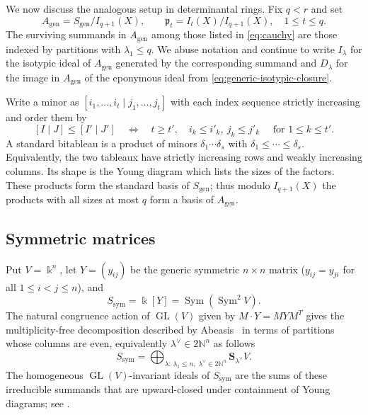 \documentclass[11pt,reqno]{amsart}
\numberwithin{equation}{subsection}
\theoremstyle{definition}
\theoremstyle{remark}
\DeclareMathOperator{\GL}{GL}
\DeclareMathOperator{\Sym}{Sym}
\newcommand{\kfield}{\Bbbk}
\newcommand{\fp}{\mathfrak p}
\newcommand{\Schur}{\mathbf S}
\begin{document}
We now discuss the analogous setup in determinantal rings. Fix $q<r$ and set
\begin{equation}\label{eq:generic-quotient}
 A_{\mathrm{gen}}=S_{\mathrm{gen}}/I_{q+1}(X),
 \qquad
 \fp_t=I_t(X)/I_{q+1}(X),\quad 1\le t\le q.
\end{equation}
The surviving summands in $A_{\mathrm{gen}}$ among those listed in  \eqref{eq:cauchy} are those indexed by
partitions with  $\lambda_1\leq q$.  We abuse notation and continue to write $I_\lambda$ for the isotypic ideal of $A_{\mathrm{gen}}$ generated by the corresponding summand and $D_\lambda$ for the image in $A_{\mathrm{gen}}$ of the eponymous ideal from \eqref{eq:generic-isotypic-closure}. 

Write a minor as $[i_1,\ldots,i_t\mid j_1,\ldots,j_t]$
with each index sequence strictly increasing and order them by
\[
 [I\mid J]\le[I'\mid J']
 \quad\Longleftrightarrow\quad
 t\ge t',\quad i_k\le i'_k,\ j_k\le j'_k\quad \text{ for } 1\le k\le t'.
\]
A standard bitableau is a product of minors $\delta_1\cdots\delta_s$ with
$\delta_1\le\cdots\le\delta_s$.  Equivalently, the two tableaux have strictly increasing rows
and weakly increasing columns.  Its shape is the Young diagram which lists the sizes of the
factors. These products form the standard basis
of $S_{\mathrm{gen}}$; thus modulo $I_{q+1}(X)$ the products with all sizes
at most $q$ form a basis of $A_{\mathrm{gen}}$. 

\subsection{Symmetric matrices}

Put $V=\kfield^{n}$, let $Y=(y_{ij})$ be the generic symmetric
$n\times n$ matrix ($y_{ij}=y_{ji}$ for all $1\leq i< j\leq n$), and 
\[
S_{\mathrm{sym}}=\kfield[Y]=\Sym(\Sym^2V).
\]
The natural congruence action of $\GL(V)$ given by $M\cdot Y=MYM^T$ gives the multiplicity-free
decomposition described by Abeasis~\cite[Theorem 2.4]{Abeasis} in terms of partitions whose columns are even, equivalently $\lambda^\vee\in 2\mathbb{N}^n$ as follows
\begin{equation}\label{eq:symmetric-decomp}
 S_{\mathrm{sym}}
 =\bigoplus_{\lambda:\,\lambda_1 \le n,\;\lambda^\vee\in 2\mathbb{N}^n}
 \Schur_{\lambda^\vee} V.
\end{equation}
The homogeneous $\GL(V)$-invariant ideals of $S_{\mathrm{sym}}$ are the sums of these irreducible
summands that are upward-closed under containment of Young diagrams; see \cite[Theorem 3.1]{Abeasis}.  
\end{document}
